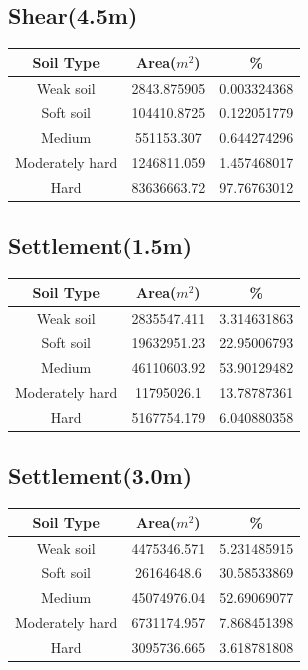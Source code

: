 \begin{center}
\subsection{Shear(4.5m)}
\begin{tabular}{|c | c | c|} 
\hline
Soil Type & Area($m^2$) & \% \\
\hline
Weak soil & 2843.875905	& 0.003324368 \\
Soft soil & 104410.8725	& 0.122051779 \\
Medium & 551153.307	& 0.644274296 \\
Moderately hard & 1246811.059 & 1.457468017 \\
Hard & 83636663.72 & 97.76763012 \\
\hline
\end{tabular}
\pagebreak

\subsection{Settlement(1.5m)}
\begin{tabular}{|c | c | c|} 
\hline
Soil Type & Area($m^2$) & \% \\
\hline
Weak soil & 2835547.411 & 3.314631863 \\
Soft soil & 19632951.23 & 22.95006793 \\
Medium & 46110603.92 & 53.90129482 \\
Moderately hard & 11795026.1 & 13.78787361 \\
Hard & 5167754.179 & 6.040880358 \\
\hline
\end{tabular}

\subsection{Settlement(3.0m)}
\begin{tabular}{|c | c | c|} 
\hline
Soil Type & Area($m^2$) & \% \\
\hline
Weak soil & 4475346.571 & 5.231485915 \\
Soft soil & 26164648.6 & 30.58533869 \\
Medium & 45074976.04 & 52.69069077 \\
Moderately hard & 6731174.957 & 7.868451398 \\
Hard & 3095736.665 & 3.618781808 \\
\hline
\end{tabular}


\end{center}
